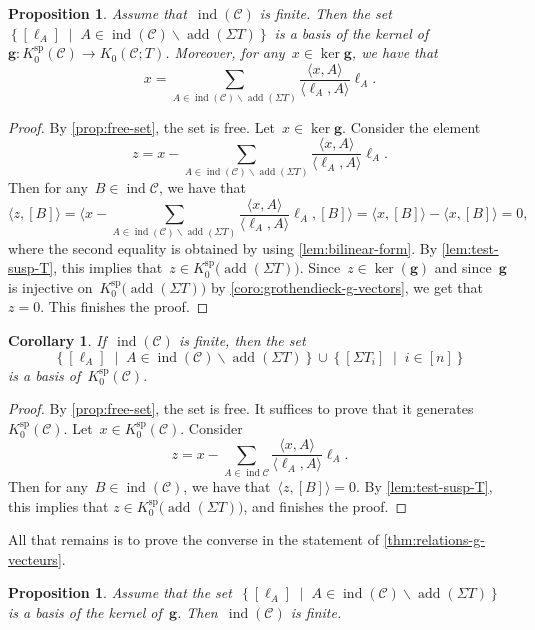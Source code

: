 \documentclass{amsart}
\newtheorem{corollary}[theorem]{Corollary}
\newtheorem{proposition}[theorem]{Proposition}
\theoremstyle{definition}
\renewcommand{\b}[1]{{\boldsymbol{#1}}} %
\newcommand{\set}[2]{\left\{ #1 \;\middle|\; #2 \right\}} %
\newcommand{\ssm}{\smallsetminus} %
\newcommand{\cat}{\mathcal{C}}
\newcommand{\susp}{\Sigma}
\newcommand{\add}{\operatorname{add}}
\newcommand{\spl}{\operatorname{sp}}
\newcommand{\Ksp}{K_0^{\spl}}
\newcommand{\ind}{\operatorname{ind}}
\begin{document}
\begin{proposition}
Assume that~$\ind(\cat)$ is finite. Then the set~$\set{[\ell_A]}{A \in \ind(\cat) \ssm \add(\susp T)}$ is a basis of the kernel of~$\b{g} : \Ksp(\cat) \to K_0(\cat ; T)$. Moreover, for any~$x \in \ker \b{g}$, we have that
\[
x= \sum_{A \in \ind(\cat) \ssm \add(\susp T)} \frac{\langle x, A \rangle}{\langle \ell_A, A \rangle} \ell_A.
\]
\end{proposition}

\begin{proof}
By \cref{prop:free-set}, the set is free. Let~$x \in \ker \b{g}$. Consider the element
\[
z = x- \sum_{A \in \ind(\cat) \ssm \add(\susp T)} \frac{\langle x, A \rangle}{\langle \ell_A, A \rangle} \ell_A.
\]
Then for any~$B \in \ind{\cat}$, we have that
\[
\langle  z, [B] \rangle = \Big\langle x- \sum_{A \in \ind(\cat) \ssm \add(\susp T)} \frac{\langle x, A \rangle}{\langle \ell_A, A \rangle} \ell_A, [B] \Big\rangle = \langle x, [B] \rangle - \langle x, [B] \rangle = 0, 
\]
where the second equality is obtained by using \cref{lem:bilinear-form}. By \cref{lem:test-susp-T}, this implies that~$z \in \Ksp \big( \add(\susp T) \big)$. Since~$z \in \ker(\b{g})$ and since~$\b{g}$ is injective on~$\Ksp \big( \add (\susp T) \big)$ by \cref{coro:grothendieck-g-vectors}, we get that~$z=0$. This finishes the proof.
\end{proof}

\begin{corollary}
If~$\ind(\cat)$ is finite, then the set
\[
\set{[\ell_A]}{A \in \ind(\cat) \ssm \add(\susp T)} \cup \set{[\susp T_i]}{i \in [n]}
\]
is a basis of~$\Ksp(\cat)$.
\end{corollary}

\begin{proof}
By \cref{prop:free-set}, the set is free. It suffices to prove that it generates~$\Ksp(\cat)$. Let~${x \in \Ksp(\cat)}$. Consider
\[
z = x - \sum_{A \in \ind{\cat}} \frac{\langle x, A \rangle}{\langle \ell_A, A\rangle} \ell_A.
\]
Then for any~$B \in \ind(\cat)$, we have that~$\langle z, [B] \rangle = 0$. By \cref{lem:test-susp-T}, this implies that ${z \in \Ksp \big( \add(\susp T) \big)}$, and finishes the proof.
\end{proof}

All that remains is to prove the converse in the statement of \cref{thm:relations-g-vecteurs}.

\begin{proposition}
Assume that the set~$\set{[\ell_A]}{A \in \ind(\cat) \ssm \add(\susp T)}$ is a basis of the kernel of~$\b{g}$. Then~$\ind(\cat)$ is finite.
\end{proposition}
\end{document}
